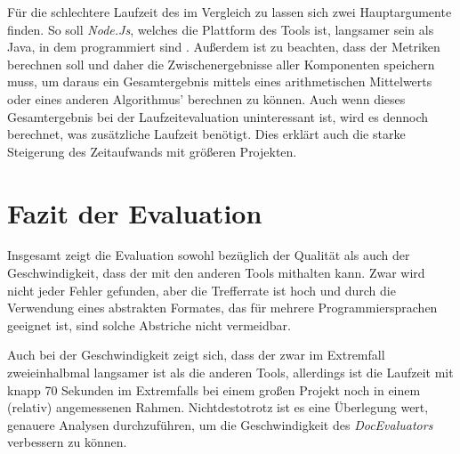 Für die schlechtere Laufzeit des \doceval im Vergleich zu \checkpmd lassen sich zwei Hauptargumente finden. So soll \textit{Node.Js}, welches die Plattform des Tools ist, langsamer sein als Java, in dem \checkpmd programmiert sind \cite{node_java_speed}.  Außerdem ist zu beachten, dass der \doceval Metriken berechnen soll und daher die Zwischenergebnisse aller Komponenten speichern muss, um daraus ein Gesamtergebnis mittels eines arithmetischen Mittelwerts oder eines anderen Algorithmus' berechnen zu können. Auch wenn dieses Gesamtergebnis bei der Laufzeitevaluation uninteressant ist, wird es dennoch berechnet, was zusätzliche Laufzeit benötigt. Dies erklärt auch die starke Steigerung des Zeitaufwands mit größeren Projekten.

\section{Fazit der Evaluation}

Insgesamt zeigt die Evaluation sowohl bezüglich der Qualität als auch der Geschwindigkeit, dass der \doceval mit den anderen Tools mithalten kann. Zwar wird nicht jeder Fehler gefunden, aber die Trefferrate ist hoch und durch die Verwendung eines abstrakten Formates, das für mehrere Programmiersprachen geeignet ist, sind solche Abstriche nicht vermeidbar. 

Auch bei der Geschwindigkeit zeigt sich, dass der \doceval zwar im Extremfall zweieinhalbmal langsamer ist als die anderen Tools, allerdings ist die Laufzeit mit knapp 70 Sekunden im Extremfalls bei einem großen Projekt noch in einem (relativ) angemessenen Rahmen. Nichtdestotrotz ist es eine Überlegung wert, genauere Analysen durchzuführen, um die Geschwindigkeit des \textit{DocEvaluators} verbessern zu können. 